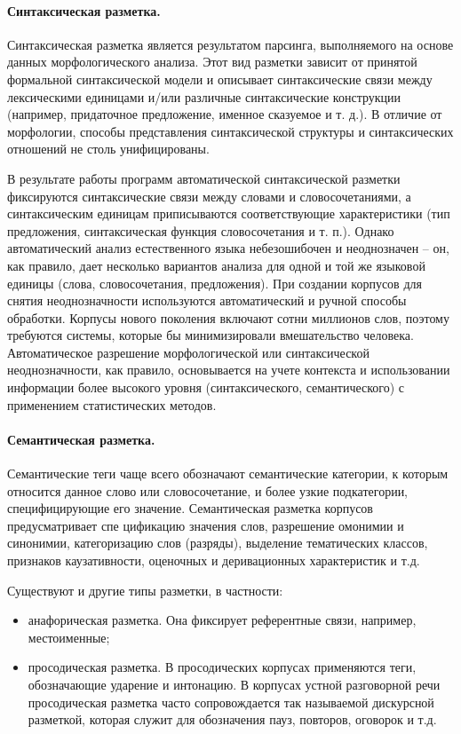 \documentclass[12pt]{article}
\theoremstyle{definition}
\theoremstyle{remark}
\numberwithin{equation}{section}
\begin{document}
\paragraph{Синтаксическая разметка.} Синтаксическая разметка является результатом парсинга, выполняемого на основе данных морфологического анализа. Этот вид разметки зависит от принятой формальной синтаксической модели и описывает синтаксические связи между лексическими единицами и/или различные синтаксические конструкции (например, придаточное предложение, именное сказуемое и т. д.). В отличие от морфологии, способы представления синтаксической структуры и синтаксических отношений не столь унифицированы.

В результате работы программ автоматической синтаксической разметки фиксируются синтаксические связи между словами и словосочетаниями, а синтаксическим единицам приписываются соответствующие характеристики (тип предложения, синтаксическая функция словосочетания и т. п.).
Однако автоматический анализ естественного языка небезошибочен и неоднозначен – он, как правило, дает несколько вариантов анализа для одной и той же языковой единицы (слова, словосочетания, предложения). При создании корпусов для снятия неоднозначности используются
автоматический и ручной способы обработки. Корпусы нового поколения включают сотни миллионов слов, поэтому требуются системы, которые бы минимизировали вмешательство человека. Автоматическое разрешение морфологической или синтаксической неоднозначности, как правило, основывается на учете
контекста и использовании информации более высокого уровня (синтаксического, семантического) с применением статистических методов.

\paragraph{Семантическая разметка.} Семантические теги чаще всего обозначают семантические категории, к которым относится данное слово или словосочетание, и более узкие подкатегории, специфицирующие его значение. Семантическая разметка корпусов предусматривает спе цификацию значения слов, разрешение омонимии и синонимии, категоризацию слов (разряды), выделение тематических классов, признаков каузативности, оценочных и деривационных характеристик и т.д.

Существуют и другие типы разметки, в частности:
\begin{itemize}
\item анафорическая разметка. Она фиксирует референтные связи, например, местоименные;
\item просодическая разметка. В просодических корпусах применяются теги, обозначающие ударение и интонацию. В корпусах устной разговорной речи просодическая разметка часто сопровождается так называемой дискурсной разметкой, которая служит для обозначения пауз, повторов, оговорок и т.д.
\end{itemize}
\end{document}
